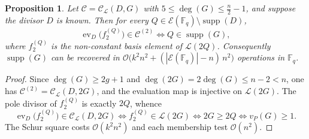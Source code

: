 \documentclass[sn-mathphys-num]{sn-jnl_modified}
\newcommand{\FF}{\ensuremath{\mathbb{F}}}
\newtheorem{proposition}[theorem]{Proposition}%
\begin{document}
\begin{proposition}\label{prop:supp_G_fast}
Let $\mathcal{C} = \mathcal{C}_\mathscr{L}(D,G)$ with $5 \leq \deg(G) \leq \frac{n}{2}-1$, and suppose the divisor $D$ is known. Then for every $Q \in \mathcal{E}(\FF_q) \setminus \operatorname{supp}(D)$,
\[
\operatorname{ev}_D\bigl(f_2^{(Q)}\bigr) \in \mathcal{C}^{(2)}
\iff
Q \in \operatorname{supp}(G),
\]
where $f_2^{(Q)}$ is the non-constant basis element of $\mathscr{L}(2Q)$. Consequently $\operatorname{supp}(G)$ can be recovered in $\mathcal{O}\bigl(k^2n^2 + (|\mathcal{E}(\FF_q)|-n)\,n^2\bigr)$ operations in $\FF_q$.
\end{proposition}
\begin{proof}
Since $\deg(G) \geq 2g+1$ and $\deg(2G) = 2\deg(G) \leq n-2 < n$, one has $\mathcal{C}^{(2)} = \mathcal{C}_\mathscr{L}(D, 2G)$, and the evaluation map is injective on $\mathscr{L}(2G)$. The pole divisor of $f_2^{(Q)}$ is exactly $2Q$, whence
\[
\operatorname{ev}_D\bigl(f_2^{(Q)}\bigr) \in \mathcal{C}_\mathscr{L}(D,2G)
\iff f_2^{(Q)} \in \mathscr{L}(2G)
\iff 2G \geq 2Q
\iff v_P(G) \geq 1 .
\]
The Schur square costs $\mathcal{O}(k^2n^2)$ and each membership test $\mathcal{O}(n^2)$.
\end{proof}
\end{document}
